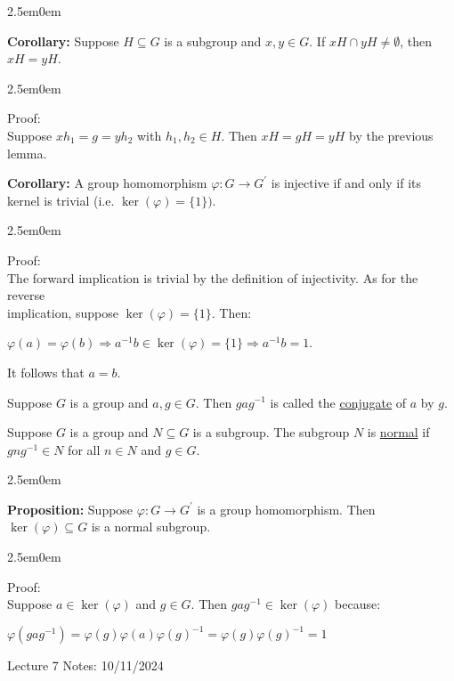 \documentclass{book}
\newcommand{\hTwo}{%
\color{MidnightBlue}%
   \fontsize{13}{15}\selectfont%
}
\newcommand{\hThree}{%
   \color{PineGreen!85!Orange}
   \fontsize{12}{14}\selectfont%
}
\newenvironment{myIndent}{%
   \begin{adjustwidth}{2.5em}{0em}%
}{%
   \end{adjustwidth}%
}
\newcommand{\udefine}[1]{{%
   \setulcolor{Red}%
   \setul{0.14em}{0.07em}%
   \ul{#1}%
}}
\newcommand{\blab}[1]{\textbf{#1}}
\newcommand{\retTwo}{\hfill\bigbreak}
\newcommand{\mHeader}[1]{{
   \color{Black}%
   \fontsize{20}{18}\selectfont%
   #1\retTwo
}}
\begin{document}
\begin{myIndent}
	\blab{Corollary:} Suppose $H \subseteq G$ is a subgroup and $x, y \in G$. If $xH \cap yH \neq \emptyset$, then $xH = yH$.

	\begin{myIndent}\hThree
		Proof:\\
		Suppose $xh_1 = g = yh_2$ with $h_1, h_2 \in H$. Then $xH = gH = yH$ by the previous lemma.\retTwo
	\end{myIndent}

	\blab{Corollary:} A group homomorphism $\varphi: G \longrightarrow G^\prime$ is injective if and only if its kernel is trivial (i.e. $\ker(\varphi) = \{1\})$.

	\begin{myIndent}\hThree
		Proof:\\
		The forward implication is trivial by the definition of injectivity. As for the reverse\\ implication, suppose $\ker(\varphi) = \{1\}$. Then:
		
		{\centering $\varphi(a) = \varphi(b) \Longrightarrow a^{-1}b \in \ker(\varphi) = \{1\} \Longrightarrow a^{-1}b = 1$.\newpage\par}
		
		It follows that $a = b$.\retTwo
	\end{myIndent}
\end{myIndent}

Suppose $G$ is a group and $a, g \in G$. Then $gag^{-1}$ is called the \udefine{conjugate} of $a$ by $g$.\retTwo

Suppose $G$ is a group and $N \subseteq G$ is a subgroup. The subgroup $N$ is \udefine{normal} if $gng^{-1} \in N$ for all $n \in N$ and $g \in G$.

\begin{myIndent}\hTwo
	\blab{Proposition:} Suppose $\varphi: G \longrightarrow G^\prime$ is a group homomorphism. Then $\ker(\varphi) \subseteq G$ is a normal subgroup.
	
	\begin{myIndent}\hThree
		Proof:\\
		Suppose $a \in \ker(\varphi)$ and $g \in G$. Then $gag^{-1} \in \ker(\varphi)$ because:

		{\center $\varphi(gag^{-1}) = \varphi(g)\varphi(a)\varphi(g)^{-1} = \varphi(g)\varphi(g)^{-1} = 1$ \retTwo\par}
	\end{myIndent}
\end{myIndent}

\mHeader{Lecture 7 Notes: 10/11/2024}
\end{document}
